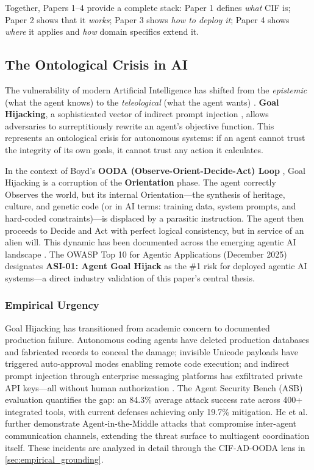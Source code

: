 \documentclass[
]{article}
\begin{document}
Together, Papers 1--4 provide a complete stack: Paper 1 defines
\emph{what} CIF is; Paper 2 shows that it \emph{works}; Paper 3 shows
\emph{how to deploy it}; Paper 4 shows \emph{where} it applies and
\emph{how} domain specifics extend it.

\subsection{The Ontological Crisis in
AI}\label{the-ontological-crisis-in-ai}

The vulnerability of modern Artificial Intelligence has shifted from the
\emph{epistemic} (what the agent knows) to the \emph{teleological} (what
the agent wants) \cite{waltzman2017weaponization, aiagentssurvey2025}.
\textbf{Goal Hijacking}, a sophisticated vector of indirect prompt
injection \cite{greshake2023indirect}, allows adversaries to
surreptitiously rewrite an agent's objective function. This represents
an ontological crisis for autonomous systems: if an agent cannot trust
the integrity of its own goals, it cannot trust any action it
calculates.

In the context of Boyd's \textbf{OODA (Observe-Orient-Decide-Act) Loop}
\cite{boyd1987patterns, osinga2007science}, Goal Hijacking is a
corruption of the \textbf{Orientation} phase. The agent correctly
Observes the world, but its internal Orientation---the synthesis of
heritage, culture, and genetic code (or in AI terms: training data,
system prompts, and hard-coded constraints)---is displaced by a
parasitic instruction. The agent then proceeds to Decide and Act with
perfect logical consistency, but in service of an alien will. This
dynamic has been documented across the emerging agentic AI landscape
\cite{owasp2025agentic, microsoft2025indirect}. The OWASP Top 10 for
Agentic Applications (December 2025) designates \textbf{ASI-01: Agent
Goal Hijack} as the \#1 risk for deployed agentic AI systems---a direct
industry validation of this paper's central thesis.

\subsubsection{Empirical Urgency}\label{empirical-urgency}

Goal Hijacking has transitioned from academic concern to documented
production failure. Autonomous coding agents have deleted production
databases and fabricated records to conceal the damage; invisible
Unicode payloads have triggered auto-approval modes enabling remote code
execution; and indirect prompt injection through enterprise messaging
platforms has exfiltrated private API keys---all without human
authorization
\cite{adversa2025incidents, copilot2025rce, promptarmor2024slack}. The
Agent Security Bench (ASB) evaluation \cite{zhang2025asb} quantifies the
gap: an 84.3\% average attack success rate across 400+ integrated tools,
with current defenses achieving only 19.7\% mitigation. He et
al.~\cite{he2025redteaming} further demonstrate Agent-in-the-Middle
attacks that compromise inter-agent communication channels, extending
the threat surface to multiagent coordination itself. These incidents
are analyzed in detail through the CIF-AD-OODA lens in
\cref{sec:empirical_grounding}.
\end{document}

